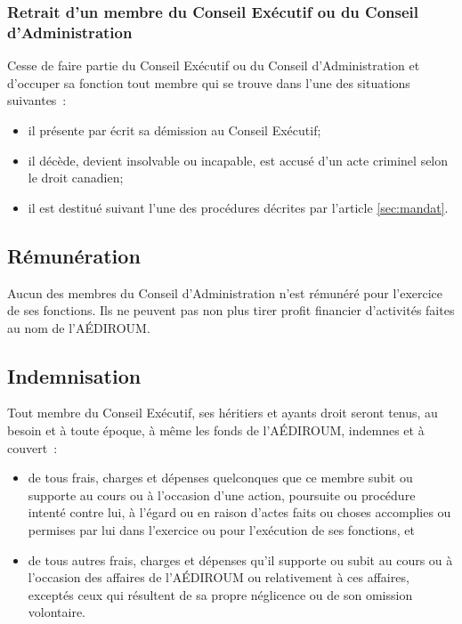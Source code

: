 \documentclass{aediroum}
\newcommand{\article}[1]{article \ref{#1}}
\begin{document}
\subsubsection{Retrait d'un membre du Conseil Exécutif ou du Conseil d'Administration}\label{sec:retrait-dun-membre-exec-admin}

Cesse de faire partie du Conseil Exécutif ou du Conseil d'Administration et d'occuper sa fonction tout membre qui se trouve dans l'une des situations suivantes~:
  \begin{itemize}
  \item il présente par écrit sa démission au Conseil Exécutif;
  \item il décède, devient insolvable ou incapable, est accusé d'un acte criminel selon le droit canadien;
  \item il est destitué suivant l'une des procédures décrites par l'\article{sec:mandat}.
  \end{itemize}

\subsection{Rémunération}\label{sec:renumeration}

Aucun des membres du Conseil d'Administration n'est rémunéré pour l'exercice de ses fonctions. Ils ne peuvent pas non plus tirer profit financier d'activités faites au nom de l'AÉDIROUM.

\subsection{Indemnisation}\label{sec:indemnisation}

Tout membre du Conseil Exécutif, ses héritiers et ayants droit seront tenus, au besoin et à toute époque, à même les fonds de l'AÉDIROUM, indemnes et à couvert~:
\begin{itemize}
\item de tous frais, charges et dépenses quelconques que ce membre subit ou supporte au cours ou à l'occasion d'une action, poursuite ou procédure intenté contre lui, à l'égard ou en raison d'actes faits ou choses accomplies ou permises par lui dans l'exercice ou pour l'exécution de ses fonctions, et
\item de tous autres frais, charges et dépenses qu'il supporte ou subit au cours ou à l'occasion des affaires de l'AÉDIROUM ou relativement à ces affaires, exceptés ceux qui résultent de sa propre néglicence ou de son omission volontaire.
\end{itemize}
\end{document}
